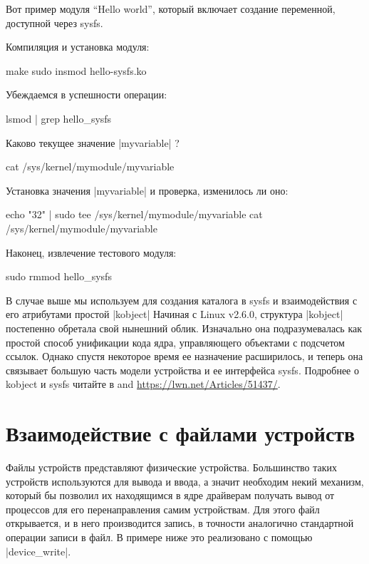 \documentclass[10pt, oneside]{book}
\begin{document}
Вот пример модуля “Hello world”, который включает создание переменной, доступной через sysfs.


Компиляция и установка модуля:

\begin{codebash}
make
sudo insmod hello-sysfs.ko
\end{codebash}

Убеждаемся в успешности операции:

\begin{codebash}
lsmod | grep hello_sysfs
\end{codebash}

Каково текущее значение \cpp|myvariable| ?

\begin{codebash}
cat /sys/kernel/mymodule/myvariable
\end{codebash}

Установка значения \cpp|myvariable| и проверка, изменилось ли оно:

\begin{codebash}
echo "32" | sudo tee /sys/kernel/mymodule/myvariable
cat /sys/kernel/mymodule/myvariable
\end{codebash}

Наконец, извлечение тестового модуля:

\begin{codebash}
sudo rmmod hello_sysfs
\end{codebash}

В случае выше мы используем для создания каталога в sysfs и взаимодействия с его атрибутами простой \cpp|kobject| Начиная с Linux v2.6.0, структура \cpp|kobject| постепенно обретала свой нынешний облик.
Изначально она подразумевалась как простой способ унификации кода ядра, управляющего объектами с подсчетом ссылок. Однако спустя некоторое время ее
назначение расширилось, и теперь она связывает большую часть модели устройства и ее интерфейса sysfs.
Подробнее о kobject и sysfs читайте в  and \url{https://lwn.net/Articles/51437/}.

\section{Взаимодействие с файлами устройств}
\label{sec:device_files}
Файлы устройств представляют физические устройства. Большинство таких устройств используются для вывода и ввода, а значит необходим некий механизм, который бы позволил их находящимся в ядре драйверам получать вывод от процессов для его перенаправления самим устройствам. Для этого файл открывается, и в него производится запись, в точности аналогично стандартной операции записи в файл. В примере ниже это реализовано с помощью \cpp|device_write|.
\end{document}
